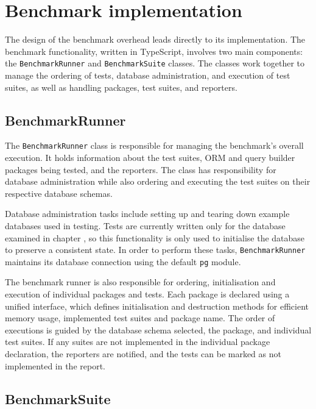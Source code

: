 \chapter{Benchmark implementation}

The design of the benchmark overhead leads directly to its implementation. The
benchmark functionality, written in TypeScript, involves two main components:
the \texttt{BenchmarkRunner} and \texttt{BenchmarkSuite} classes. The classes
work together to manage the ordering of tests, database administration, and
execution of test suites, as well as handling packages, test suites, and
reporters.


\section{BenchmarkRunner}

The \texttt{BenchmarkRunner} class is responsible for managing the benchmark’s
overall execution. It holds information about the test suites, ORM and query
builder packages being tested, and the reporters. The class has responsibility
for database administration while also ordering and executing the test suites on
their respective database schemas.

Database administration tasks include setting up and tearing down example
databases used in testing. Tests are currently written only for the database
examined in chapter , so this functionality is only used to
initialise the database to preserve a consistent state. In order to perform
these tasks, \texttt{BenchmarkRunner} maintains its database connection using
the default \texttt{pg} module.

The benchmark runner is also responsible for ordering, initialisation and
execution of individual packages and tests. Each package is declared using a
unified interface, which defines initialisation and destruction methods for
efficient memory usage, implemented test suites and package name. The order of
executions is guided by the database schema selected, the package, and
individual test suites. If any suites are not implemented in the individual
package declaration, the reporters are notified, and the tests can be marked as
not implemented in the report.

\section{BenchmarkSuite}


